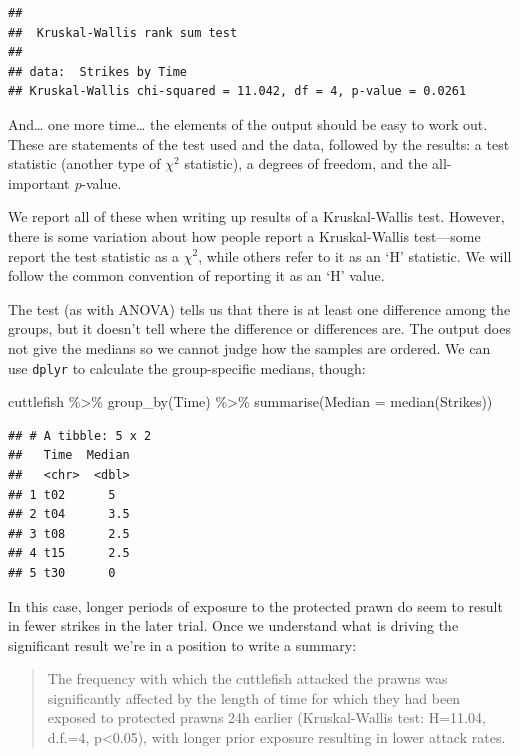 \documentclass[
]{book}
\newenvironment{Shaded}{\begin{snugshade}}{\end{snugshade}}
\newcommand{\AttributeTok}[1]{\textcolor[rgb]{0.77,0.63,0.00}{#1}}
\newcommand{\FunctionTok}[1]{\textcolor[rgb]{0.00,0.00,0.00}{#1}}
\newcommand{\NormalTok}[1]{#1}
\newcommand{\SpecialCharTok}[1]{\textcolor[rgb]{0.00,0.00,0.00}{#1}}
\begin{document}
\begin{verbatim}
## 
##  Kruskal-Wallis rank sum test
## 
## data:  Strikes by Time
## Kruskal-Wallis chi-squared = 11.042, df = 4, p-value = 0.0261
\end{verbatim}

And\ldots{} one more time\ldots{} the elements of the output should be easy to work out. These are statements of the test used and the data, followed by the results: a test statistic (another type of \(\chi^2\) statistic), a degrees of freedom, and the all-important \emph{p}-value.

We report all of these when writing up results of a Kruskal-Wallis test. However, there is some variation about how people report a Kruskal-Wallis test---some report the test statistic as a \(\chi^2\), while others refer to it as an `H' statistic. We will follow the common convention of reporting it as an `H' value.

The test (as with ANOVA) tells us that there is at least one difference among the groups, but it doesn't tell where the difference or differences are. The output does not give the medians so we cannot judge how the samples are ordered. We can use \texttt{dplyr} to calculate the group-specific medians, though:

\begin{Shaded}
\begin{Highlighting}[]
\NormalTok{cuttlefish }\SpecialCharTok{\%\textgreater{}\%} 
  \FunctionTok{group\_by}\NormalTok{(Time) }\SpecialCharTok{\%\textgreater{}\%} 
  \FunctionTok{summarise}\NormalTok{(}\AttributeTok{Median =} \FunctionTok{median}\NormalTok{(Strikes))}
\end{Highlighting}
\end{Shaded}

\begin{verbatim}
## # A tibble: 5 x 2
##   Time  Median
##   <chr>  <dbl>
## 1 t02      5  
## 2 t04      3.5
## 3 t08      2.5
## 4 t15      2.5
## 5 t30      0
\end{verbatim}

In this case, longer periods of exposure to the protected prawn do seem to result in fewer strikes in the later trial. Once we understand what is driving the significant result we're in a position to write a summary:

\begin{quote}
The frequency with which the cuttlefish attacked the prawns was significantly affected by the length of time for which they had been exposed to protected prawns 24h earlier (Kruskal-Wallis test: H=11.04, d.f.=4, p\textless0.05), with longer prior exposure resulting in lower attack rates.
\end{quote}
\end{document}
